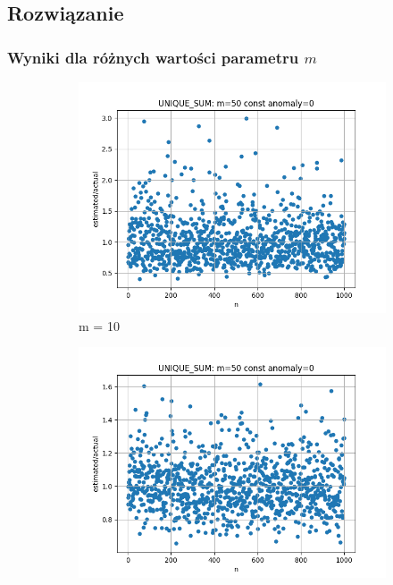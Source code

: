 \documentclass{article}
\begin{document}
    \subsection{Rozwiązanie}

    \subsubsection{Wyniki dla różnych wartości parametru $m$}

        \begin{figure}[H]
            \begin{subfigure}{0.6\textwidth}
                \centering
                \includegraphics[width=\linewidth]{sum/zad1_m=10.png}
                \caption{m = 10}
            \end{subfigure}
            \begin{subfigure}{0.6\textwidth}
                \centering
                \includegraphics[width=\linewidth]{sum/zad1_m=50.png}

\end{subfigure}
\end{figure}
\end{document}
